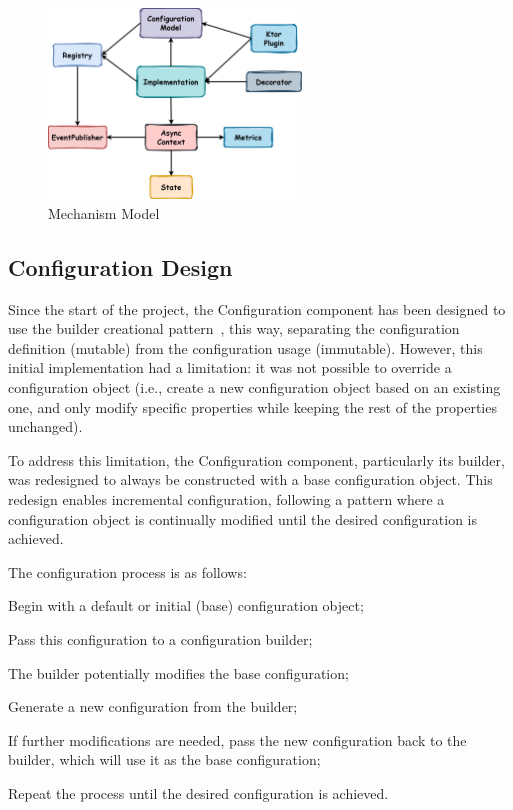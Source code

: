 \begin{figure}[!htb]
    \centering
    \includegraphics[width=0.6\textwidth]{../figures/03_mechanism-model}
    \caption{Mechanism Model}
    \label{fig:mechanism-model}
\end{figure}

\subsection{Configuration Design}\label{subsec:configuration-design}

Since the start of the project, the Configuration component has been designed to use the builder creational pattern~\cite{effective-java, design-patterns}, this way, separating the configuration definition (mutable) from the configuration usage (immutable).
However, this initial implementation had a limitation: it was not possible to override a configuration object (i.e., create a new configuration object based on an existing one, and only modify specific properties while keeping the rest of the properties unchanged).

To address this limitation, the Configuration component, particularly its builder,
was redesigned to always be constructed with a base configuration object.
This redesign enables incremental configuration, following a pattern where a configuration object is continually modified until the desired configuration is achieved.

The configuration process is as follows:

\begin{boldenumerate}
    \item Begin with a default or initial (base) configuration object;
    \item Pass this configuration to a configuration builder;
    \item The builder potentially modifies the base configuration;
    \item Generate a new configuration from the builder;
    \item If further modifications are needed, pass the new configuration back to the builder, which will use it as the base configuration;
    \item Repeat the process until the desired configuration is achieved.
\end{boldenumerate}

